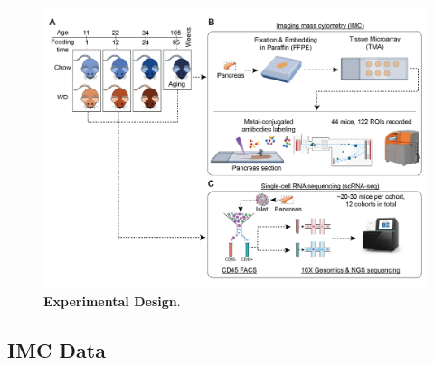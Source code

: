 \begin{figure}[H]
\centering
\includegraphics[width=12cm]{Chapter4/Fig/F2-1-01.png}
\caption[Experimental Design]{\textbf{Experimental Design}.\\}
\label{fig:wdaging_experimental_design}
\end{figure}

\subsection{IMC Data}

